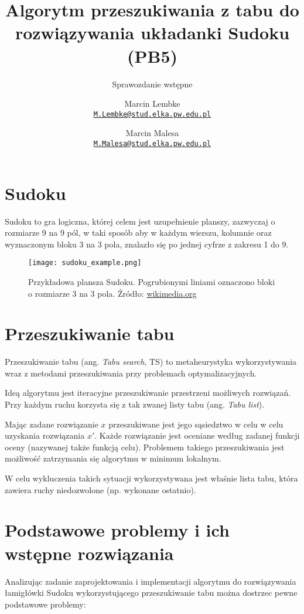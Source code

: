 \documentclass[]{project_report}
\author{%
	Marcin Lembke\\
	\texttt{\href{mailto:M.Lembke@stud.elka.pw.edu.pl}%
			{\nolinkurl{M.Lembke@stud.elka.pw.edu.pl}}}
	\and
	Marcin Malesa\\
	\texttt{\href{mailto:M.Malesa@stud.elka.pw.edu.pl}%
			{\nolinkurl{M.Malesa@stud.elka.pw.edu.pl}}}
}
\title{Algorytm przeszukiwania z tabu do rozwiązywania układanki Sudoku (PB5)}
\subtitle{Sprawozdanie wstępne}
\begin{document}
	\maketitle
	
	\section{Sudoku}
	Sudoku to gra logiczna, której celem jest uzupełnienie planszy, zazwyczaj o rozmiarze 9 na 9 pól, w taki sposób aby w każdym wierszu, kolumnie oraz wyznaczonym bloku 3 na 3 pola, znalazło się po jednej cyfrze z zakresu 1 do 9.
	
	\begin{figure}[H]
		\centering
		\texttt{[image: sudoku\_example.png]}
		\caption{Przykładowa plansza Sudoku. Pogrubionymi liniami oznaczono bloki o rozmiarze 3 na 3 pola. Źródło: \href{https://upload.wikimedia.org/wikipedia/commons/2/2d/Sudoku_przyklad.png}{wikimedia.org}}
	\end{figure}
	
	\section{Przeszukiwanie tabu}
	Przeszukiwanie tabu (ang. \textit{Tabu search}, TS) to metaheurystyka wykorzystywania wraz z metodami przeszukiwania przy problemach optymalizacyjnych.
	
	Ideą algorytmu jest iteracyjne przeszukiwanie przestrzeni możliwych rozwiązań. Przy każdym ruchu korzysta się z tak zwanej listy tabu (ang. \textit{Tabu list}).
	
	Mając zadane rozwiązanie \(x\) przeszukiwane jest jego sąsiedztwo w celu w celu uzyskania rozwiązania \(x'\). Każde rozwiązanie jest oceniane według zadanej funkcji oceny (nazywanej także funkcją celu). Problemem takiego przeszukiwania jest możliwość zatrzymania się algorytmu w minimum lokalnym.
	
	W celu wykluczenia takich sytuacji wykorzystywana jest właśnie lista tabu, która zawiera ruchy niedozwolone (np. wykonane ostatnio).
	
	\section{Podstawowe problemy i ich wstępne rozwiązania}
	Analizując zadanie zaprojektowania i implementacji algorytmu do rozwiązywania łamigłówki Sudoku wykorzystującego przeszukiwanie tabu można dostrzec pewne podstawowe problemy:
	
\end{document}
